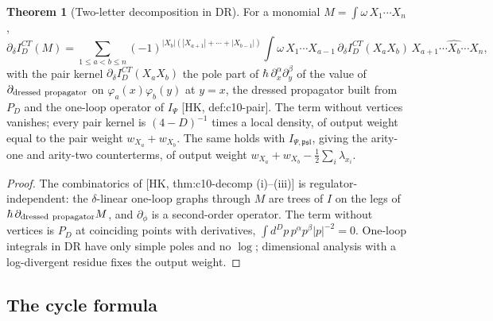 \documentclass[11pt]{article}
\theoremstyle{definition}
\newtheorem{theorem}[definition]{Theorem}
\numberwithin{equation}{section}
\begin{document}
\begin{theorem}[Two-letter decomposition in DR]
\label{thm:decompD}
For a monomial $M=\int\omega\,X_1\cdots X_n$,
\[
\partial_\delta I^{CT}_D(M)=\sum_{1\le a<b\le n}(-1)^{|X_b|(|X_{a+1}|+\cdots+|X_{b-1}|)}\int\omega\,X_1\cdots X_{a-1}\,\partial_\delta I^{CT}_D(X_aX_b)\,X_{a+1}\cdots\widehat{X_b}\cdots X_n,
\]
with the pair kernel $\partial_\delta I^{CT}_D(X_aX_b)$ the pole part of $\hbar\,\partial^\alpha_x\partial^\beta_y$ of the value of $\partial_{\rm dressed\ propagator}$ on $\varphi_a(x)\varphi_b(y)$ at $y=x$, the dressed propagator built from $P_D$ and the one-loop operator of $I_{\Psi}$ [HK, def:c10-pair]. The term without vertices vanishes; every pair kernel is $(4-D)^{-1}$ times a local density, of output weight equal to the pair weight $w_{X_a}+w_{X_b}$. The same holds with $I_{\Psi,\mathfrak{psl}}$, giving the arity-one and arity-two counterterms, of output weight $w_{X_a}+w_{X_b}-\frac12\sum_i\lambda_{x_i}$.
\end{theorem}

\begin{proof}
The combinatorics of [HK, thm:c10-decomp (i)--(iii)] is regulator-independent: the $\delta$-linear one-loop graphs through $M$ are trees of $I$ on the legs of $\hbar\,\partial_{\rm dressed\ propagator}M$, and $\partial_\phi$ is a second-order operator. The term without vertices is $P_D$ at coinciding points with derivatives, $\int d^Dp\,p^\alpha p^\beta|p|^{-2}=0$. One-loop integrals in DR have only simple poles and no $\log$; dimensional analysis with a log-divergent residue fixes the output weight.
\end{proof}

\subsection{The cycle formula}
\end{document}
